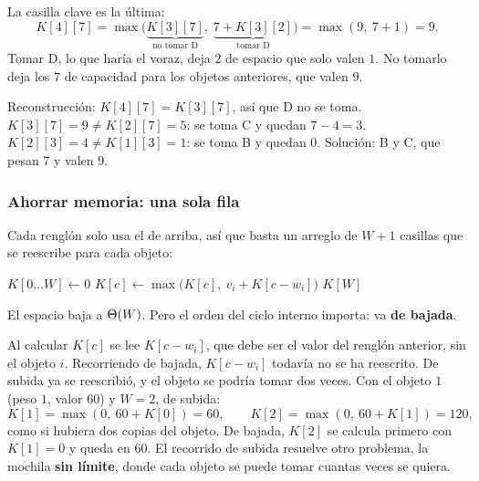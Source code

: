\documentclass[11pt,letterpaper]{article}
\begin{document}
La casilla clave es la última:
\[
  K[4][7] = \max\big(\underbrace{K[3][7]}_{\text{no tomar D}} ,\;
            \underbrace{7 + K[3][2]}_{\text{tomar D}}\big)
          = \max(9,\ 7 + 1) = 9 .
\]
Tomar D, lo que haría el voraz, deja $2$ de espacio que solo valen $1$.
No tomarlo deja los $7$ de capacidad para los objetos anteriores, que
valen $9$.

Reconstrucción: $K[4][7] = K[3][7]$, así que D no se toma.
$K[3][7] = 9 \neq K[2][7] = 5$: se toma C y quedan $7 - 4 = 3$.
$K[2][3] = 4 \neq K[1][3] = 1$: se toma B y quedan $0$. Solución: B y
C, que pesan $7$ y valen $9$.

\subsubsection*{Ahorrar memoria: una sola fila}

Cada renglón solo usa el de arriba, así que basta un arreglo de $W + 1$
casillas que se reescribe para cada objeto:

\begin{algorithm}[H]
\caption{\textsc{Mochila-01-Una-Fila}$(w, v, n, W)$}
\begin{algorithmic}[1]
\State $K[0 \ldots W] \gets 0$
    \State $K[c] \gets \max\big(K[c],\ v_i + K[c - w_i]\big)$
  \EndFor
\EndFor
\State \Return $K[W]$
\end{algorithmic}
\end{algorithm}

El espacio baja a $\Theta\!\left(W\right)$. Pero el orden del ciclo interno importa:
va \textbf{de bajada}.

\begin{ojo}
  Al calcular $K[c]$ se lee $K[c - w_i]$, que debe ser el valor del
  renglón anterior, sin el objeto $i$. Recorriendo de bajada,
  $K[c - w_i]$ todavía no se ha reescrito. De subida ya se reescribió,
  y el objeto se podría tomar dos veces. Con el objeto $1$ (peso $1$,
  valor $60$) y $W = 2$, de subida:
  \[
    K[1] = \max(0,\ 60 + K[0]) = 60 , \qquad
    K[2] = \max(0,\ 60 + K[1]) = 120 ,
  \]
  como si hubiera dos copias del objeto. De bajada, $K[2]$ se calcula
  primero con $K[1] = 0$ y queda en $60$. El recorrido de subida
  resuelve otro problema, la mochila \textbf{sin límite}, donde cada
  objeto se puede tomar cuantas veces se quiera.
\end{ojo}

\end{document}
